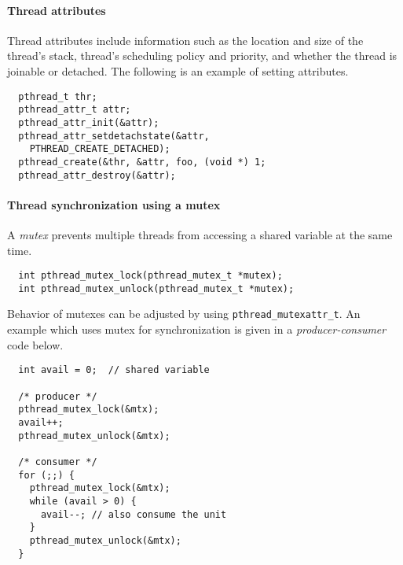 \documentclass{memo}
\begin{document}
\paragraph{Thread attributes} Thread attributes include information such as
the location and size of the thread's stack, thread's scheduling
policy and priority, and whether the thread is joinable or detached. The
following is an example of setting attributes.
\begin{verbatim}
  pthread_t thr;
  pthread_attr_t attr;
  pthread_attr_init(&attr);
  pthread_attr_setdetachstate(&attr,
    PTHREAD_CREATE_DETACHED);
  pthread_create(&thr, &attr, foo, (void *) 1;
  pthread_attr_destroy(&attr);
\end{verbatim}

\paragraph{Thread synchronization using a mutex}
A {\em mutex\/} prevents multiple threads from accessing a shared variable at
the same time. 
\begin{verbatim}
  int pthread_mutex_lock(pthread_mutex_t *mutex);
  int pthread_mutex_unlock(pthread_mutex_t *mutex);
\end{verbatim}
Behavior of mutexes can be adjusted by using \verb+pthread_mutexattr_t+. An
example which uses mutex for synchronization is given in a {\em
  producer-consumer\/} code below.
\begin{verbatim}
  int avail = 0;  // shared variable
 
  /* producer */
  pthread_mutex_lock(&mtx);
  avail++;
  pthread_mutex_unlock(&mtx);
 
  /* consumer */
  for (;;) {
    pthread_mutex_lock(&mtx);
    while (avail > 0) {
      avail--; // also consume the unit
    }
    pthread_mutex_unlock(&mtx);
  }
\end{verbatim}
\end{document}
